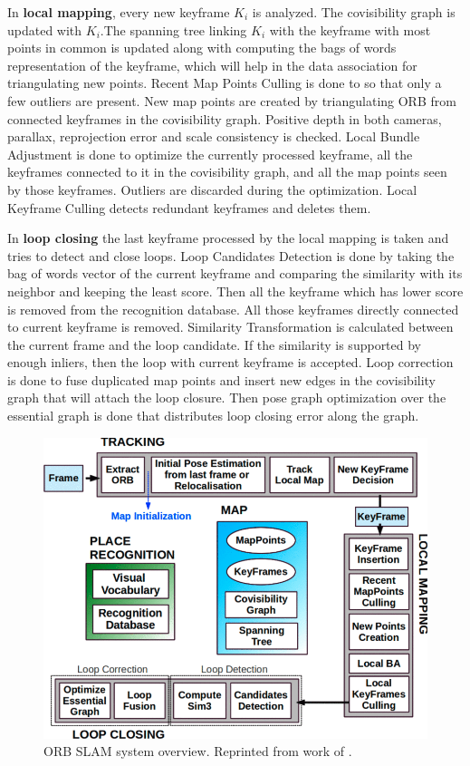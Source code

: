 In \textbf{local mapping}, every new keyframe $K_i$ is analyzed. The covisibility graph is updated with $K_i$.The spanning tree linking $K_i$ with the keyframe with most points in common is updated along with computing the bags of words representation of the keyframe, which will help in the data association for triangulating new points. Recent Map Points Culling is done to so that only a few outliers are present. New map points are created by triangulating ORB from connected keyframes in the covisibility graph. Positive depth in both cameras, parallax, reprojection error and scale consistency is checked. Local Bundle Adjustment is done to optimize the currently processed keyframe, all the keyframes connected to it in the covisibility graph, and all the map points seen by those keyframes. Outliers are discarded during the optimization. Local Keyframe Culling detects redundant keyframes and deletes them.

In \textbf{loop closing}  the last keyframe processed by the local mapping is taken and tries to detect and close loops. Loop Candidates Detection is done by taking the bag of words vector of the current keyframe and comparing the similarity with its neighbor and keeping the least score. Then all the keyframe which has lower score is removed from the recognition database. All those keyframes directly connected to current keyframe is removed. Similarity Transformation is calculated between the current frame and the loop candidate. If the similarity is supported by enough inliers, then the loop with current keyframe is accepted. Loop correction is done to fuse duplicated map points and insert new edges in the covisibility graph that will attach the loop closure. Then pose graph optimization over the essential graph is done that distributes loop closing error along the graph. 


\begin{figure}
	\centering
	\includegraphics[width=5in]{figures/orb_slam1}
	\caption[ORB SLAM architecture]{\small 
		ORB SLAM system overview. Reprinted from work of . }
	\label{fig:orb_slam1}
\end{figure}

